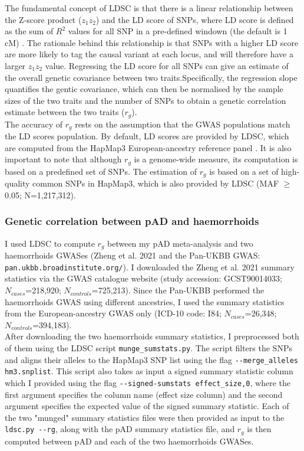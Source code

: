 The fundamental concept of LDSC is that there is a linear relationship between the Z-score product ($z_{1}z_{2}$) and the LD score of SNPs, where LD score is defined as the sum of $R^{2}$ values for all SNP in a pre-defined windown (the default is 1 cM) \cite{Bulik-Sullivan2015-ts}. The rationale behind this relationship is that SNPs with a higher LD score are more likely to tag the causal variant at each locus, and will therefore have a larger $z_{1}z_{2}$ value. Regressing the LD score for all SNPs can give an estimate of the overall genetic covariance between two traits.Specifically, the regression slope quantifies the gentic covariance, which can then be normalised by the sample sizes of the two traits and the number of SNPs to obtain a genetic correlation estimate between the two traits ($r_{g}$).\\

The accuracy of $r_{g}$ rests on the assumption that the GWAS populations match the LD scores population. By default, LD scores are provided by LDSC, which are computed from the HapMap3 European-ancestry reference panel \cite{hapmap}. It is also important to note that although $r_{g}$ is a genome-wide measure, its computation is based on a predefined set of SNPs. The estimation of $r_{g}$ is based on a set of high-quality common SNPs in HapMap3, which is also provided by LDSC (MAF $\geq$ 0.05; N=1,217,312).

\subsubsection{Genetic correlation between pAD and haemorrhoids}
I used LDSC to compute $r_{g}$ between my pAD meta-analysis and two haemorrhoids GWASes (Zheng et al. 2021 \cite{Zheng2021-ss} and the Pan-UKBB GWAS: \Verb+pan.ukbb.broadinstitute.org/+). I downloaded the Zheng et al. 2021 summary statistics via the GWAS catalogue website (study accession: GCST90014033; $N_{cases}$=218,920; $N_{controls}$=725,213). Since the Pan-UKBB performed the haemorrhoids GWAS using different ancestries, I used the summary statistics from the European-ancestry GWAS only (ICD-10 code: I84; $N_{cases}$=26,348; $N_{controls}$=394,183). \\

After downloading the two haemorrhoids summary statistics, I preprocessed both of them using the LDSC script \Verb+munge_sumstats.py+. The script filters the SNPs and aligns their alleles to the HapMap3 SNP list using the flag \Verb+--merge_alleles hm3.snplist+. This script also takes as input a signed summary statistic column which I provided using the flag \Verb+--signed-sumstats effect_size,0+, where the first argument specifies the column name (effect size column) and the second argument specifies the expected value of the signed summary statistic. Each of the two "munged" summary statistics files were then provided as input to the \Verb+ldsc.py --rg+, along with the pAD summary statistics file, and $r_{g}$ is then computed between pAD and each of the two haemorrhoids GWASes. 



